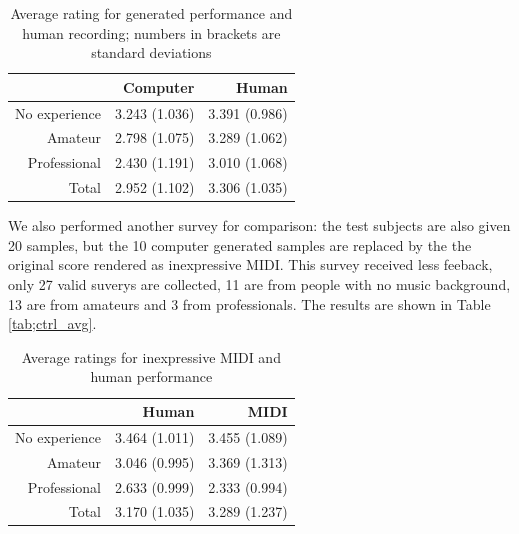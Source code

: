 \begin{table}
   \centering
   \caption{Average rating for generated performance and human recording; numbers in brackets are standard deviations} 
   \label{tab:avg_rating}
   \begin{tabular}{r|rr}
      \hline
      &Computer &Human \\
      \hline
      No experience&3.243 (1.036)&3.391 (0.986)\\
      Amateur&2.798 (1.075)&3.289 (1.062)\\
      Professional&2.430 (1.191)&3.010 (1.068)\\
      \hline
      Total&2.952 (1.102)&3.306 (1.035)\\
      \hline
   \end{tabular}
\end{table}

We also performed another survey for comparison: the test subjects are also given 20 samples, but the 10 computer generated samples are replaced by the the original score rendered as inexpressive MIDI. This survey received less feeback, only 27 valid suverys are collected, 11 are from people with no music background, 13 are from amateurs and 3 from professionals. The results are shown in Table \ref{tab;ctrl_avg}.

\begin{table}
   \centering
   \caption{Average ratings for inexpressive MIDI and human performance}
   \label{tab:ctrl_avg}
   \begin{tabular}{r|rr}
      \hline
      &Human& MIDI \\
      \hline
      No experience&3.464 (1.011)&3.455 (1.089)\\
      Amateur&3.046 (0.995)&3.369 (1.313)\\
      Professional&2.633 (0.999)&2.333 (0.994)\\
      \hline
      Total&3.170 (1.035)&3.289 (1.237)\\
\hline
   \end{tabular}
\end{table}

